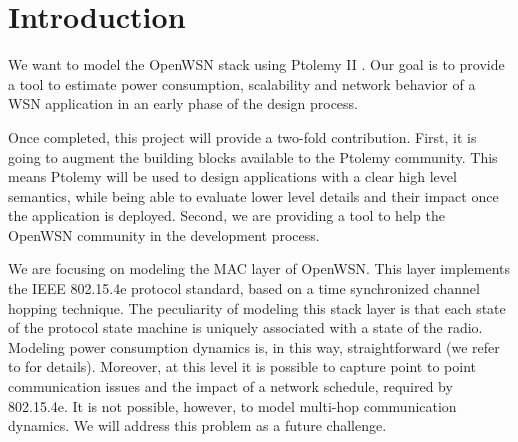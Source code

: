 \section{Introduction}
We want to model the OpenWSN \cite{watteyne2012openwsn} stack using Ptolemy II \cite{davis1999overview}. Our goal is to provide a tool to estimate power consumption, scalability and network behavior of a WSN application in an early phase of the design process.

Once completed, this project will provide a two-fold contribution. First, it is going to augment the building blocks available to the Ptolemy community. This means Ptolemy will be used to design applications with a clear high level semantics, while being able to evaluate lower level details and their impact once the application is deployed. Second, we are providing a tool to help the OpenWSN community in the development process.

We are focusing on modeling the MAC layer of OpenWSN. This layer implements the IEEE 802.15.4e protocol standard, based on a time synchronized channel hopping technique. The peculiarity of modeling this stack layer is that each state of the protocol state machine is uniquely associated with a state of the radio. Modeling power consumption dynamics is, in this way, straightforward (we refer to \cite{vilajosana2013realistic} for details). Moreover, at this level it is possible to capture point to point communication issues and the impact of a network schedule, required by 802.15.4e. It is not possible, however, to model multi-hop communication dynamics. We will address this problem as a future challenge.

